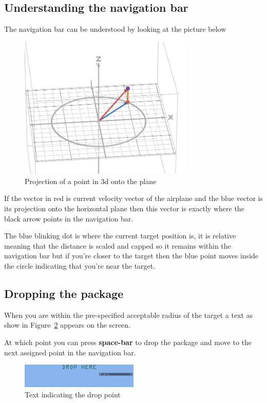 \subsection{Understanding the navigation bar}
The navigation bar can be understood by looking at the picture below
\begin{figure}[H]
    \centering
    \includegraphics[width=0.75\textwidth]{images/figure1.png}
    \caption{Projection of a point in 3d onto the plane}
    \label{fig:projection}
\end{figure}


If the vector in red is current velocity vector of the airplane and the blue vector is its projection onto the horizontal plane then this vector is exactly where the black arrow points in the navigation bar.

The blue blinking dot is where the current target position is, it is relative meaning that the distance is scaled and capped so it remains within the navigation bar but if you're closer to the target then the blue point moves inside the circle indicating that you're near the target.

\subsection{Dropping the package}

When you are within the pre-specified acceptable radius of the target a text as show in Figure~\ref{fig:drop_text} appears on the screen.

At which point you can press \textbf{space-bar} to drop the package and move to the next assigned point in the navigation bar.


\begin{figure}[H]
    \centering
    \includegraphics[width=0.5\textwidth]{images/figure2.png}
    \caption{Text indicating the drop point}
    \label{fig:drop_text}
\end{figure}



